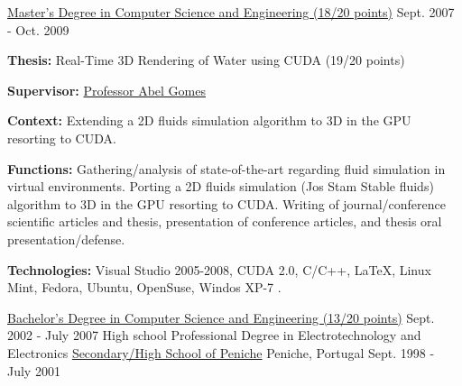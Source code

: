 \begin{cventries}
{    }
  \vspace{-0.7cm}  
  \cventry
    {\href{https://www.ubi.pt/en/course/804}{Master's Degree in Computer Science and Engineering (18/20 points)}} %
    {} %
    {} %
    {Sept. 2007 - Oct. 2009} %
    {
      \begin{cvitems} %
        \item[] {\textbf{Thesis:} Real-Time 3D Rendering of Water using CUDA (19/20 points)}
        \item[] {\textbf{Supervisor:} \href{http://www.di.ubi.pt/~agomes/}{Professor Abel Gomes}}
		\item[] {\textbf{Context:} Extending a 2D fluids simulation algorithm to 3D in the GPU resorting to CUDA.}
		\item[] {\textbf{Functions:} Gathering/analysis of state-of-the-art regarding fluid simulation in virtual environments. Porting a 2D fluids simulation (Jos Stam Stable fluids) algorithm to 3D in the GPU resorting to CUDA. Writing of journal/conference scientific articles and thesis, presentation of conference articles, and thesis oral presentation/defense.}
        \item[] {\textbf{Technologies:}  \textcolor{rainbowcolor-olive}{Visual Studio 2005-2008}, \textcolor{rainbowcolor-indigo}{CUDA 2.0}, \textcolor{rainbowcolor-indigo}{C/C++}, 
\textcolor{rainbowcolor-indigo}{LaTeX}, %
\textcolor{rainbowcolor-orange}{Linux Mint}, \textcolor{rainbowcolor-orange}{Fedora}, \textcolor{rainbowcolor-orange}{Ubuntu}, \textcolor{rainbowcolor-orange}{OpenSuse}, \textcolor{rainbowcolor-orange}{Windos XP-7}       
      	.}
      \end{cvitems}
    }
  \cventry
    {\href{https://www.ubi.pt/en/course/42}{Bachelor's Degree in Computer Science and Engineering (13/20 points)}} %
    {} %
    {} %
    {Sept. 2002 - July 2007} %
    {
    }
  \vspace{-0.55cm}
  \cventry
    {High school Professional Degree in Electrotechnology and Electronics} %
    {\href{http://espeniche.pt/sitesp/index.php}{Secondary/High School of Peniche}} %
    {Peniche, Portugal} %
    {Sept. 1998 - July 2001} %
    {
    }
\end{cventries}
